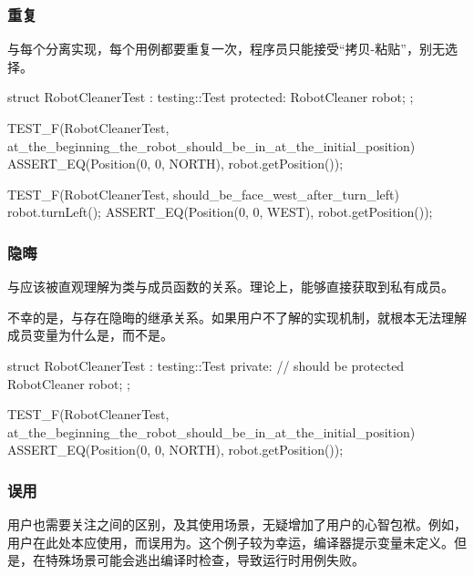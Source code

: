 \begin{content}
\subsubsection{重复}

与每个分离实现，每个用例都要重复一次，程序员只能接受“拷贝-粘贴”，别无选择。

\begin{leftbar}
 \begin{c++}
struct RobotCleanerTest : testing::Test {
protected:
  RobotCleaner robot;
};
 
TEST_F(RobotCleanerTest, at_the_beginning_the_robot_should_be_in_at_the_initial_position) {
  ASSERT_EQ(Position(0, 0, NORTH), robot.getPosition());
}
 
TEST_F(RobotCleanerTest, should_be_face_west_after_turn_left) {
  robot.turnLeft();
  ASSERT_EQ(Position(0, 0, WEST), robot.getPosition());
}
  \end{c++}
\end{leftbar}

\subsubsection{隐晦}

与应该被直观理解为类与成员函数的关系。理论上，能够直接获取到私有成员。

不幸的是，与存在隐晦的继承关系。如果用户不了解的实现机制，就根本无法理解成员变量为什么是，而不是。

\begin{leftbar}
 \begin{c++}
struct RobotCleanerTest : testing::Test {
private:  // should be protected
  RobotCleaner robot;
};
 
TEST_F(RobotCleanerTest, at_the_beginning_the_robot_should_be_in_at_the_initial_position) {
  ASSERT_EQ(Position(0, 0, NORTH), robot.getPosition());
}
  \end{c++}
\end{leftbar}

\subsubsection{误用}

用户也需要关注之间的区别，及其使用场景，无疑增加了用户的心智包袱。例如，用户在此处本应使用，而误用为。这个例子较为幸运，编译器提示变量未定义。但是，在特殊场景可能会逃出编译时检查，导致运行时用例失败。


\end{content}

